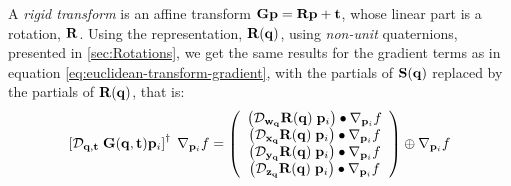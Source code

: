A {\it rigid transform} is an affine transform
${\mathbf G} {\mathbf p}  = {\mathbf R} {\mathbf p} + {\mathbf t} $,
whose linear part is a rotation, ${\mathbf R}$.
Using the representation, ${\mathbf R}({\mathbf q})$,
using {\em non-unit} quaternions,
presented in \autoref{sec:Rotations},
we get the same results for the gradient terms
as in equation \ref{eq:euclidean-transform-gradient},
with the partials of ${\mathbf S}({\mathbf q})$ replaced by the
partials of ${\mathbf R}({\mathbf q})$, that is:
\begin{equation}
\label{eq:rigid-transform-gradient}
\left[
\Df{\q,\t}{\; \G(\q,\t)\p_i}
\right]^{\dagger} \;
\Gf{\p_i}{f}
=
\left(
\begin{array}{c}
\left( \Df{\w_{\q}}{\R(\q)} \; \p_i \right) \bullet \Gf{\p_i}{f} \\
\left( \Df{\x_{\q}}{\R(\q)} \; \p_i \right) \bullet \Gf{\p_i}{f} \\
\left( \Df{\y_{\q}}{\R(\q)} \; \p_i \right) \bullet \Gf{\p_i}{f} \\
\left( \Df{\z_{\q}}{\R(\q)} \; \p_i \right) \bullet \Gf{\p_i}{f} \\
\end{array}
\right)
\oplus
\Gf{\p_i}{f}
\end{equation}
